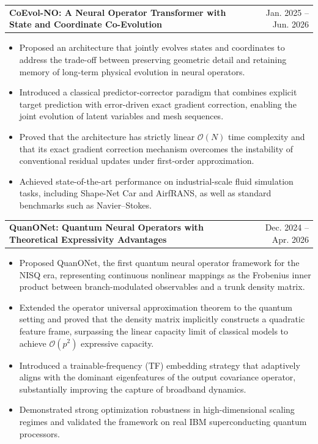 \documentclass[letterpaper,11pt]{article}
\makeatletter
\newcommand{\project}[2]{%
  \begin{tabularx}{\textwidth}{@{}>{\raggedright\arraybackslash}X@{\hspace{1.2em}}r@{}}
    \textbf{#1} & #2
  \end{tabularx}\par\vspace{1pt}
}
\makeatother
\begin{document}
\vspace{9pt}
\project{CoEvol-NO: A Neural Operator Transformer with State and Coordinate Co-Evolution}
  {Jan. 2025 -- Jun. 2026}
\begin{itemize}
  \item Proposed an architecture that jointly evolves states and coordinates to address the trade-off between preserving geometric detail and retaining memory of long-term physical evolution in neural operators.
  \item Introduced a classical predictor-corrector paradigm that combines explicit target prediction with error-driven exact gradient correction, enabling the joint evolution of latent variables and mesh sequences.
  \item Proved that the architecture has strictly linear $\mathcal{O}(N)$ time complexity and that its exact gradient correction mechanism overcomes the instability of conventional residual updates under first-order approximation.
  \item Achieved state-of-the-art performance on industrial-scale fluid simulation tasks, including Shape-Net Car and AirfRANS, as well as standard benchmarks such as Navier--Stokes.
\end{itemize}

\vspace{9pt}
\project{QuanONet: Quantum Neural Operators with Theoretical Expressivity Advantages}
  {Dec. 2024 -- Apr. 2026}
\begin{itemize}
  \item Proposed QuanONet, the first quantum neural operator framework for the NISQ era, representing continuous nonlinear mappings as the Frobenius inner product between branch-modulated observables and a trunk density matrix.
  \item Extended the operator universal approximation theorem to the quantum setting and proved that the density matrix implicitly constructs a quadratic feature frame, surpassing the linear capacity limit of classical models to achieve $\mathcal{O}(p^2)$ expressive capacity.
  \item Introduced a trainable-frequency (TF) embedding strategy that adaptively aligns with the dominant eigenfeatures of the output covariance operator, substantially improving the capture of broadband dynamics.
  \item Demonstrated strong optimization robustness in high-dimensional scaling regimes and validated the framework on real IBM superconducting quantum processors.
\end{itemize}
\end{document}
